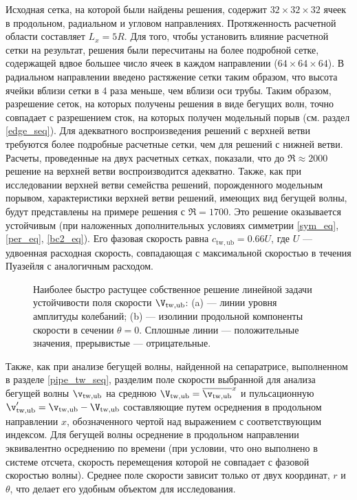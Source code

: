 Исходная сетка, на которой были найдены решения, содержит $32 \times 32 \times 32$ ячеек в продольном, радиальном и угловом направлениях. Протяженность расчетной области составляет $L_x = 5R$. Для того, чтобы установить влияние расчетной сетки на результат, решения были пересчитаны на более подробной сетке, содержащей вдвое большее число ячеек в каждом направлении ($64 \times 64 \times 64$). В радиальном направлении введено растяжение сетки таким образом, что высота ячейки вблизи сетки в 4 раза меньше, чем вблизи оси трубы. Таким образом, разрешение сеток, на которых получены решения в виде бегущих волн, точно совпадает с разрешением сток, на которых получен модельный порыв (см. раздел \ref{edge_seq}). Для адекватного воспроизведения решений с верхней ветви требуются более подробные расчетные сетки, чем для решений с нижней ветви. Расчеты, проведенные на двух расчетных сетках, показали, что до $\Re \approx 2000$ решение на верхней ветви воспроизводится адекватно. Также, как при исследовании верхней ветви семейства решений, порожденного модельным порывом, характеристики верхней ветви решений, имеющих вид бегущей волны, будут представлены на примере решения с $\Re = 1700$. Это решение оказывается устойчивым (при наложенных дополнительных условиях симметрии \eqref{sym_eq}, \eqref{per_eq}, \eqref{bc2_eq}). Его фазовая скорость равна $c_\mathrm{tw,ub} = 0.66U$, где $U$ --- удвоенная расходная скорость, совпадающая с максимальной скоростью в течения Пуазейля с аналогичным расходом. 

\begin{figure}
\caption{Наиболее быстро растущее собственное решение линейной задачи устойчивости поля скорости $\V_\mathrm{tw,ub}$: (a) --- линии уровня амплитуды колебаний; (b) --- изолинии продольной компоненты скорости в сечении $\theta = 0$. Сплошные линии --- положительные значения, прерывистые --- отрицательные.}
\label{pipeTWub_lin_pic}
\end{figure}

Также, как при анализе бегущей волны, найденной на сепаратрисе, выполненном в разделе \ref{pipe_tw_seq}, разделим поле скорости выбранной для анализа бегущей волны $\v_\mathrm{tw,ub}$ на среднюю $\V_\mathrm{tw,ub} = \overline{\v_\mathrm{tw,ub}}^x$ и пульсационную $\v'_\mathrm{tw,ub} = \v_\mathrm{tw,ub} - \V_\mathrm{tw,ub}$ составляющие путем осреднения в продольном направлении $x$, обозначенного чертой над выражением с соответствующим индексом.  Для бегущей волны осреднение в продольном направлении эквивалентно осреднению по времени (при условии, что оно выполнено в системе отсчета, скорость перемещения которой не совпадает с фазовой скоростью волны). Среднее поле скорости зависит только от двух координат, $r$ и $\theta$, что делает его удобным объектом для исследования. 

